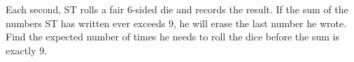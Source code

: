Each second, ST rolls a fair $6$-sided die and records the result. If the sum of the numbers ST has written ever exceeds $9$, he will erase the last number he wrote. Find the expected number of times he needs to roll the dice before the sum is exactly $9$.
